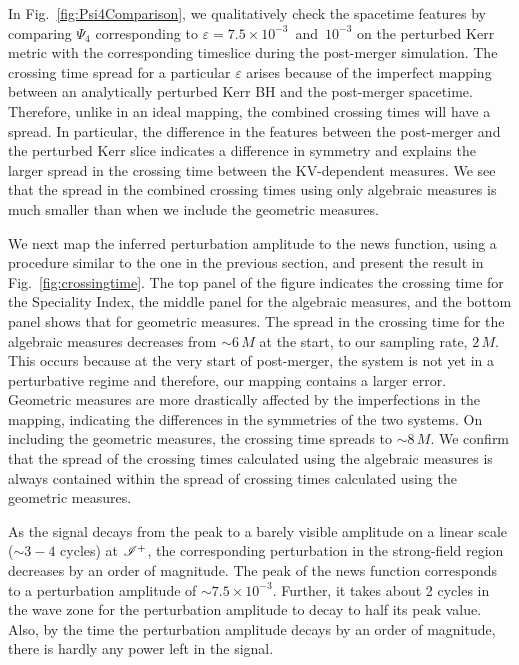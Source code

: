 \ampmap


In Fig.~\ref{fig:Psi4Comparison}, we qualitatively check the spacetime features by comparing $\Psi_4$ corresponding to $\varepsilon = 7.5 \times 10^{-3}$~and~$10^{-3}$ on the perturbed Kerr metric with the corresponding timeslice during the post-merger simulation. The crossing time spread for a particular $\varepsilon$ arises because of the imperfect mapping between an analytically perturbed Kerr BH and the post-merger spacetime. Therefore, unlike in an ideal mapping, the combined crossing times will have a spread. In particular, the difference in the features between the post-merger and the perturbed Kerr slice indicates a difference in symmetry and explains the larger spread in the crossing time between the  KV-dependent measures. We see that the spread in the combined crossing times using only algebraic measures is much smaller than when we include the geometric measures. 



We next map the inferred perturbation amplitude to the news function, using a procedure similar to the one in the previous section, and present the result in Fig.~\ref{fig:crossingtime}. The top panel of the figure indicates the crossing time for the Speciality Index, the middle panel for the algebraic measures, and the bottom panel shows that for geometric measures. The spread in the crossing time for the algebraic measures decreases from $ \sim 6\,M$ at the start, to our sampling rate, $2\,M$. This occurs because at the very start of post-merger, the system is not yet in a perturbative regime and therefore, our mapping contains a larger error. Geometric measures are more drastically affected by the imperfections in the mapping, indicating the differences in the symmetries of the two systems. On including the geometric measures, the crossing time spreads to $ \sim 8\,M$. We confirm that the spread of the crossing times calculated using the algebraic measures is always contained within the spread of crossing times calculated using the geometric measures. 

As the signal decays from the peak to a barely visible amplitude on a linear scale ($\sim 3-4$ cycles) at $\mathscr{I^+}$, the corresponding perturbation in the strong-field region decreases by an order of magnitude. The peak of the news function corresponds to a perturbation amplitude of $\sim 7.5 \times 10^{-3}$. Further, it takes about 2 cycles in the wave zone for the perturbation amplitude to decay to half its peak value. Also, by the time the perturbation amplitude decays by an order of magnitude, there is hardly any power left in the signal. 

